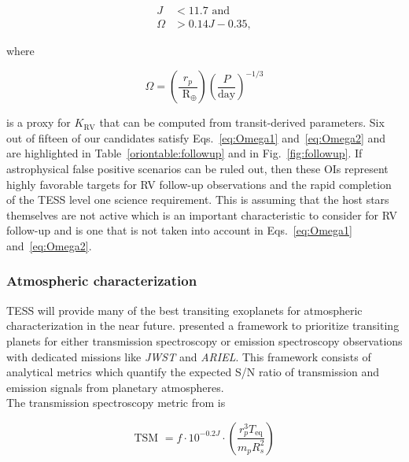 \begin{align}
  J &< 11.7 \text{ and} \label{eq:Omega1} \\
  \Omega &> 0.14J - 0.35, \label{eq:Omega2}
\end{align}

\noindent where

\begin{equation}
\Omega = \left( \frac{r_p}{\text{ R}_{\oplus}} \right) \left( \frac{P}{\text{day}}  \right)^{-1/3}
\end{equation}

\noindent is a proxy for $K_{\text{RV}}$ that can be computed from transit-derived parameters.
Six out of fifteen of our candidates satisfy Eqs.~\ref{eq:Omega1} and~\ref{eq:Omega2} and are highlighted
in Table~\ref{oriontable:followup} and in Fig.~\ref{fig:followup}.
If astrophysical false positive scenarios can be ruled out, then these OIs
represent highly favorable targets for RV follow-up observations and the rapid completion of the
TESS level one science requirement. This is assuming that the host stars themselves are not active which
is an important characteristic to consider for RV follow-up \citep{moutou17} and is one that is not taken into
account in Eqs.~\ref{eq:Omega1} and~\ref{eq:Omega2}.

\subsubsection{Atmospheric characterization} \label{sect:atmospheres}
TESS will provide many of the best transiting exoplanets for atmospheric characterization in the
near future. \cite{kempton18} presented a framework to prioritize transiting planets for
either transmission spectroscopy or emission spectroscopy observations with dedicated missions
like \emph{JWST} and \emph{ARIEL}. This framework consists of analytical metrics which quantify
the expected S/N ratio of transmission and emission signals from planetary atmospheres. \\

The transmission spectroscopy metric from \cite{kempton18} is

\begin{equation}
  \text{TSM } = f \cdot 10^{-0.2J} \cdot \left( \frac{r_p^3 T_{\text{eq}}}{m_p R_s^2} \right)
  \label{eq:tsm}
\end{equation}

